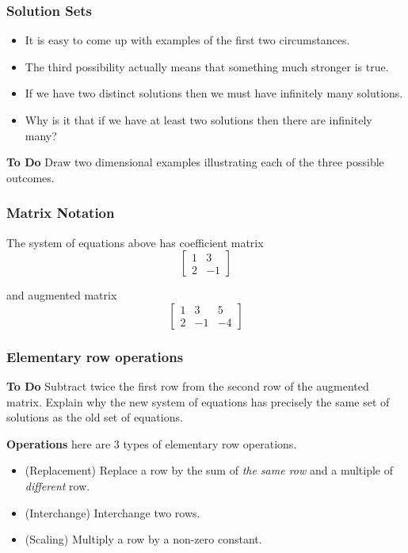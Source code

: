  \begin{frame}[fragile] \frametitle{Solution Sets} 
\begin{itemize}
 \item It is easy to come up with examples of the first two circumstances.  
 \item The third possibility actually means that something much stronger is true.
\item If we have two distinct solutions then we must have infinitely many solutions.
\item Why is it that if we have at least two solutions then there are infinitely many?
\end{itemize}

\textbf {To Do}
Draw two dimensional examples illustrating each of the three possible outcomes. 


\end{frame}




  \begin{frame}[fragile]  \frametitle{Matrix Notation}
The system of equations above has coefficient matrix
$$
\begin{bmatrix}
 1 & 3 \\
 2 & -1
\end{bmatrix}
$$


and augmented matrix 
$$
\begin{bmatrix}
 1 & 3 & 5\\
 2 & -1 & -4
\end{bmatrix}
$$

\end{frame}




  \begin{frame}[fragile]\frametitle{Elementary row operations}

\textbf {To Do}
 Subtract twice the first row from the second row of the augmented matrix.
 Explain why the new system of equations has precisely the same set of solutions
 as the old set of equations.



\textbf{Operations}
here are 3 types of elementary row operations.
\begin{itemize}
 \item (Replacement) Replace a row by the sum of {\em the same row} and a multiple of {\em different} row. 
 \item (Interchange)  Interchange two rows.
 \item (Scaling) Multiply a row by a non-zero constant.
\end{itemize}


\end{frame}


